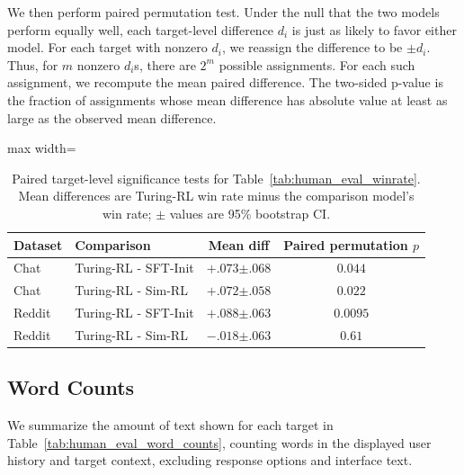 \documentclass{article} %
\newcommand{\subtle}[1]{{\tiny\color[gray]{0.4}#1}}
\begin{document}
We then perform paired permutation test. Under the null that the two models perform equally well, each target-level difference $d_i$ is just as likely to favor either model. For each target with nonzero $d_i$, we reassign the difference to be $\pm d_i$. Thus, for $m$ nonzero $d_i$s, there are $2^m$ possible assignments. For each such assignment, we recompute the mean paired difference. The two-sided p-value is the fraction of assignments whose mean difference has absolute value at least as large as the observed mean difference.

\begin{table}[t]
\centering
\small
\setlength{\tabcolsep}{3.5pt}
\begin{adjustbox}{max width=\linewidth}
\begin{tabular}{@{}llcc@{}}
\toprule
Dataset & Comparison & Mean diff & Paired permutation $p$ \\
\midrule
Chat & Turing-RL - SFT-Init & $+.073$\subtle{$\pm .068$} & $0.044$ \\
Chat & Turing-RL - Sim-RL & $+.072$\subtle{$\pm .058$} & $0.022$ \\
Reddit & Turing-RL - SFT-Init & $+.088$\subtle{$\pm .063$} & $0.0095$ \\
Reddit & Turing-RL - Sim-RL & $-.018$\subtle{$\pm .063$} & $0.61$ \\
\bottomrule
\end{tabular}
\end{adjustbox}
\caption{Paired target-level significance tests for Table~\ref{tab:human_eval_winrate}. Mean differences are Turing-RL win rate minus the comparison model's win rate; $\pm$ values are 95\% bootstrap CI.}
\label{tab:human_eval_significance}
\end{table}

\subsection{Word Counts}
We summarize the amount of text shown for each target in Table~\ref{tab:human_eval_word_counts}, counting words in the displayed user history and target context, excluding response options and interface text.
\end{document}
